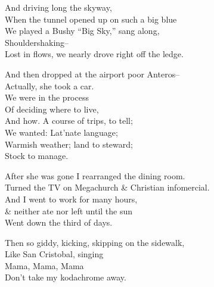 

And driving long the skyway, \\
When the tunnel opened up on such a big blue \\
We played a Bushy ``Big Sky,'' sang along, \\
Shouldershaking-- \\
Lost in flows, we nearly drove right off the ledge. 

And then dropped at the airport poor Anteros-- \\
Actually, she took a car. \\
We were in the process \\
Of deciding where to live, \\
And how. A course of trips, to tell; \\
We wanted: Lat'nate language; \\
Warmish weather; land to steward; \\
Stock to manage.

After she was gone I rearranged the dining room. \\
Turned the TV on Megachurch \& Christian infomercial. \\
And I went to work for many hours, \\
\& neither ate nor left until the sun \\
Went down  the third of days.

Then so giddy, kicking, skipping on the sidewalk, \\
Like San Cristobal, singing \\
\qquad Mama, Mama, Mama \\
\qquad Don't take my kodachrome away.


